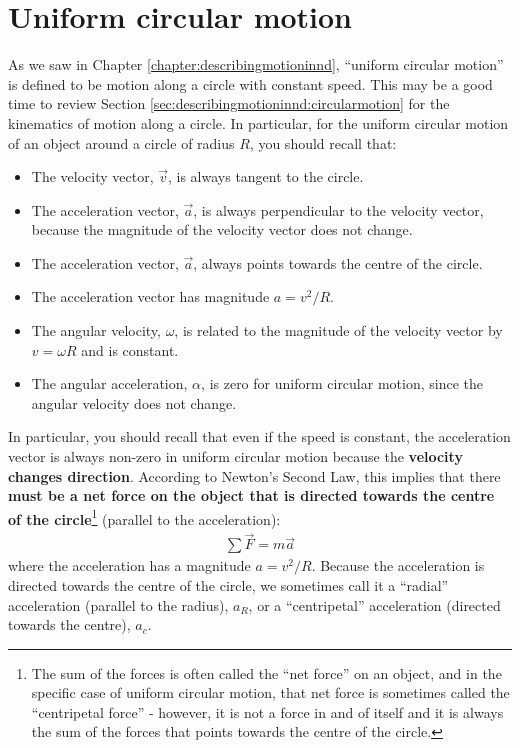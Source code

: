 \section{Uniform circular motion}
As we saw in Chapter \ref{chapter:describingmotioninnd}, ``uniform circular motion'' is defined to be motion along a circle with constant speed. This may be a good time to review Section \ref{sec:describingmotioninnd:circularmotion} for the kinematics of motion along a circle. In particular, for the uniform circular motion of an object around a circle of radius $R$, you should recall that:
\begin{itemize}
\item The velocity vector, $\vec v$, is always tangent to the circle.
\item The acceleration vector, $\vec a$, is always perpendicular to the velocity vector, because the magnitude of the velocity vector does not change.
\item The acceleration vector, $\vec a$, always points towards the centre of the circle.
\item The acceleration vector has magnitude $a=v^2/R$.
\item The angular velocity, $\omega$, is related to the magnitude of the velocity vector by $v=\omega R$ and is constant.
\item The angular acceleration, $\alpha$, is zero for uniform circular motion, since the angular velocity does not change.
\end{itemize}
In particular, you should recall that even if the speed is constant, the acceleration vector is always non-zero in uniform circular motion because the \textbf{velocity changes direction}. According to Newton's Second Law, this implies that there \textbf{must be a net force on the object that is directed towards the centre of the circle}\footnote{The sum of the forces is often called the ``net force'' on an object, and in the specific case of uniform circular motion, that net force is sometimes called the ``centripetal force'' - however, it is not a force in and of itself and it is always the sum of the forces that points towards the centre of the circle.} (parallel to the acceleration):
\begin{align*}
\sum \vec F = m\vec a
\end{align*} 
where the acceleration has a magnitude $a=v^2/R$. Because the acceleration is directed towards the centre of the circle, we sometimes call it a ``radial'' acceleration (parallel to the radius), $a_R$, or a ``centripetal'' acceleration (directed towards the centre), $a_c$.

